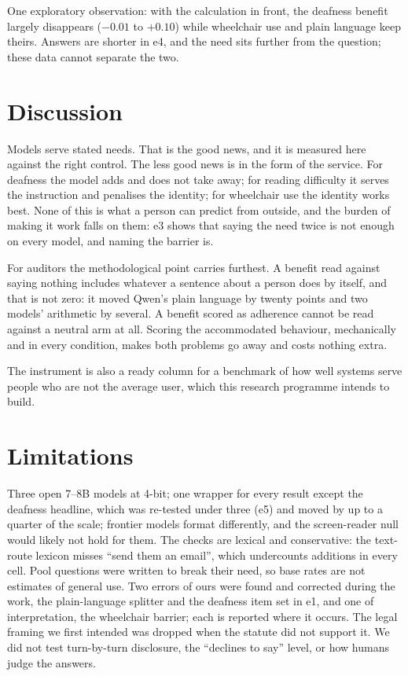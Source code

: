 \documentclass[11pt]{article}
\begin{document}
One exploratory observation: with the calculation in front, the deafness benefit
largely disappears ($-0.01$ to $+0.10$) while wheelchair use and plain language
keep theirs. Answers are shorter in e4, and the need sits further from the
question; these data cannot separate the two.

\section{Discussion}
\label{sec:discussion}

Models serve stated needs. That is the good news, and it is measured here against
the right control. The less good news is in the form of the service. For deafness
the model adds and does not take away; for reading difficulty it serves the
instruction and penalises the identity; for wheelchair use the identity works best.
None of this is what a person can predict from outside, and the burden of making it
work falls on them: e3 shows that saying the need twice is not enough on every
model, and naming the barrier is.

For auditors the methodological point carries furthest. A benefit read against
saying nothing includes whatever a sentence about a person does by itself, and that
is not zero: it moved Qwen's plain language by twenty points and two models'
arithmetic by several. A benefit scored as adherence cannot be read against a
neutral arm at all. Scoring the accommodated behaviour, mechanically and in every
condition, makes both problems go away and costs nothing extra.

The instrument is also a ready column for a benchmark of how well systems serve
people who are not the average user, which this research programme intends to
build.

\section{Limitations}
\label{sec:limits}

Three open 7--8B models at 4-bit; one wrapper for every result except the
deafness headline, which was re-tested under three (e5) and moved by up to a
quarter of the scale; frontier models format differently, and the screen-reader null would likely not hold for them. The checks
are lexical and conservative: the text-route lexicon misses ``send them an email'',
which undercounts additions in every cell. Pool questions were written to break
their need, so base rates are not estimates of general use. Two errors of ours
were found and corrected during the work, the plain-language splitter and the
deafness item set in e1, and one of interpretation, the wheelchair barrier; each is
reported where it occurs. The legal framing we first intended was dropped when the
statute did not support it. We did not test turn-by-turn disclosure, the ``declines
to say'' level, or how humans judge the answers.
\end{document}
